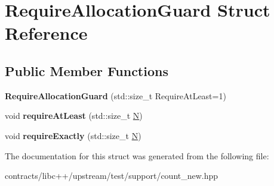 \hypertarget{struct_require_allocation_guard}{}\section{Require\+Allocation\+Guard Struct Reference}
\label{struct_require_allocation_guard}
\subsection*{Public Member Functions}
\begin{DoxyCompactItemize}
\item 
\mbox{\label{struct_require_allocation_guard_a9033b6f4e25db9a12adfc524b957595a}} 
{\bfseries Require\+Allocation\+Guard} (std\+::size\+\_\+t Require\+At\+Least=1)
\item 
\mbox{\label{struct_require_allocation_guard_a435e0f8fdbb5b44ee52e14a0e7d8cce7}} 
void {\bfseries require\+At\+Least} (std\+::size\+\_\+t \mbox{\hyperlink{group__types_gaf9c1edb0e0da55ec6ba09f32f6839529}{N}})
\item 
\mbox{\label{struct_require_allocation_guard_aafa8e0352a90f13b86701d7a97e580ed}} 
void {\bfseries require\+Exactly} (std\+::size\+\_\+t \mbox{\hyperlink{group__types_gaf9c1edb0e0da55ec6ba09f32f6839529}{N}})
\end{DoxyCompactItemize}


The documentation for this struct was generated from the following file\+:\begin{DoxyCompactItemize}
\item 
contracts/libc++/upstream/test/support/count\+\_\+new.\+hpp\end{DoxyCompactItemize}

